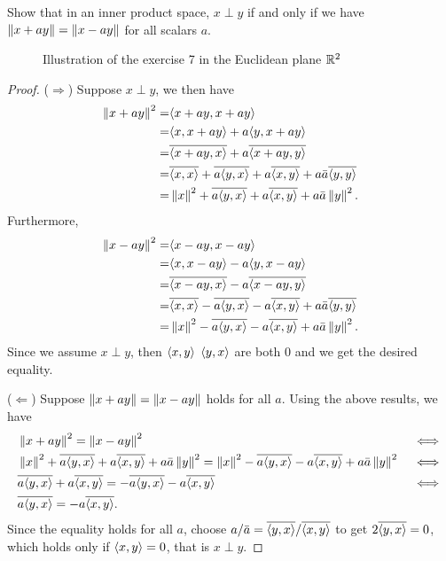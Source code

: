\begin{exercise}{7}
Show that in an inner product space, $x\perp y$ if and only if we have $\left\lVert x+ay\right\rVert = \left\lVert x-ay\right\rVert$ for all scalars $a$.

\begin{figure}[H]
    \centering
    
    \caption{Illustration of the exercise 7 in the Euclidean plane $\mathbb{R}^2$}
    \label{fig:sec3-1-ex7}
\end{figure}
\end{exercise}
\begin{proof}
($\Rightarrow$)
Suppose $x\perp y$, we then have
\begin{align*}
    \left\lVert x+ay\right\rVert^2
    =& \langle x+ay, x+ay\rangle\\
    =& \langle x, x+ay\rangle + a\langle y,x+ay\rangle\\
    =& \overline{\langle x+ay, x\rangle} + a\overline{\langle x+ay,y\rangle}\\
    =& \overline{\langle x, x\rangle} + \overline{a\langle y, x\rangle}
    + a\overline{\langle x,y\rangle} + a\bar{a}\overline{\langle y,y\rangle}\\
    =& \left\lVert x\right\rVert^2 + \overline{a\langle y, x\rangle}
    + a\overline{\langle x,y\rangle} + a\bar{a}\left\lVert y\right\rVert^2.
\end{align*}
Furthermore,
\begin{align*}
    \left\lVert x-ay\right\rVert^2
    =& \langle x-ay, x-ay\rangle\\
    =& \langle x, x-ay\rangle - a\langle y,x-ay\rangle\\
    =& \overline{\langle x-ay, x\rangle} - a\overline{\langle x-ay,y\rangle}\\
    =& \overline{\langle x, x\rangle} - \overline{a\langle y, x\rangle}
    - a\overline{\langle x,y\rangle} + a\bar{a}\overline{\langle y,y\rangle}\\
    =& \left\lVert x\right\rVert^2 - \overline{a\langle y, x\rangle}
    - a\overline{\langle x,y\rangle} + a\bar{a}\left\lVert y\right\rVert^2.
\end{align*}
Since we assume $x\perp y$, then $\langle x,y\rangle$ $\langle y,x\rangle$ are both 0 and we get the desired equality.

($\Leftarrow$)
Suppose $\left\lVert x+ay\right\rVert =\left\lVert x-ay\right\rVert$ holds for all $a$.
Using the above results, we have
\begin{align*}
    &\left\lVert x+ay\right\rVert^2 = \left\lVert x-ay\right\rVert^2 &&\iff\\
    &\left\lVert x\right\rVert^2 + \overline{a\langle y, x\rangle}
    + a\overline{\langle x,y\rangle} + a\bar{a}\left\lVert y\right\rVert^2 
    = \left\lVert x\right\rVert^2 - \overline{a\langle y, x\rangle}
    - a\overline{\langle x,y\rangle} + a\bar{a}\left\lVert y\right\rVert^2 &&\iff\\
    &\overline{a\langle y, x\rangle}
    + a\overline{\langle x,y\rangle}
    = - \overline{a\langle y, x\rangle}
    - a\overline{\langle x,y\rangle} &&\iff\\
    &\overline{a\langle y, x\rangle}
    = -a\overline{\langle x,y\rangle}.
\end{align*}
Since the equality holds for all $a$, choose $a/\bar{a}=\overline{\langle y,x\rangle}/\overline{\langle x,y\rangle}$ to get $2\overline{\langle y,x\rangle}=0$, which holds only if $\langle x,y\rangle=0$, that is $x\perp y$.
\end{proof}

